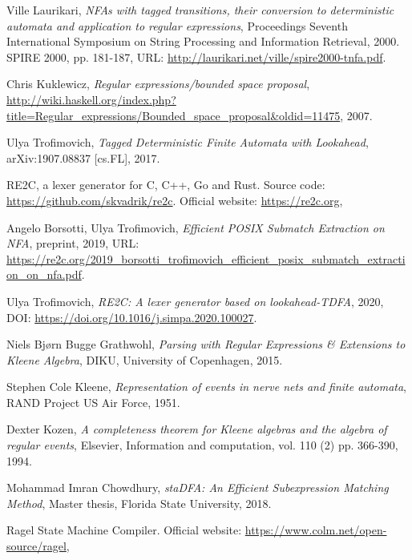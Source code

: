 \documentclass[]{article}
\begin{document}
\begin{thebibliography}{99}

    Ville Laurikari,
    \textit{NFAs with tagged transitions, their conversion to deterministic automata and application to regular expressions},
    Proceedings Seventh International Symposium on String Processing and Information Retrieval, 2000. SPIRE 2000,
    pp. 181-187,
    URL: \url{http://laurikari.net/ville/spire2000-tnfa.pdf}.

    Chris Kuklewicz,
    \textit{Regular expressions/bounded space proposal},
    \url{http://wiki.haskell.org/index.php?title=Regular_expressions/Bounded_space_proposal&oldid=11475},
    2007.

    Ulya Trofimovich,
    \textit{Tagged Deterministic Finite Automata with Lookahead},
    arXiv:1907.08837 [cs.FL],
    2017.

    RE2C, a lexer generator for C, C++, Go and Rust.
    Source code: \url{https://github.com/skvadrik/re2c}.
    Official website: \url{https://re2c.org},

    Angelo Borsotti, Ulya Trofimovich,
    \textit{Efficient POSIX Submatch Extraction on NFA},
    preprint, 2019,
    URL: \url{https://re2c.org/2019_borsotti_trofimovich_efficient_posix_submatch_extraction_on_nfa.pdf}.

    Ulya Trofimovich,
    \textit{RE2C: A lexer generator based on lookahead-TDFA},
    2020,
    DOI: \url{https://doi.org/10.1016/j.simpa.2020.100027}.

    Niels Bj{\o}rn Bugge Grathwohl,
    \textit{Parsing with Regular Expressions \& Extensions to Kleene Algebra},
    DIKU, University of Copenhagen,
    2015.

    Stephen Cole Kleene,
    \textit{Representation of events in nerve nets and finite automata},
    RAND Project US Air Force,
    1951.

    Dexter Kozen,
    \textit{A completeness theorem for {Kleene} algebras and the algebra of regular events},
    Elsevier,
    Information and computation,
    vol. 110 (2)
    pp. 366-390,
    1994.

    Mohammad Imran Chowdhury,
    \textit{staDFA: An Efficient Subexpression Matching Method},
    Master thesis,
    Florida State University,
    2018.

    Ragel State Machine Compiler.
    Official website: \url{https://www.colm.net/open-source/ragel},

\end{thebibliography}
\end{document}
